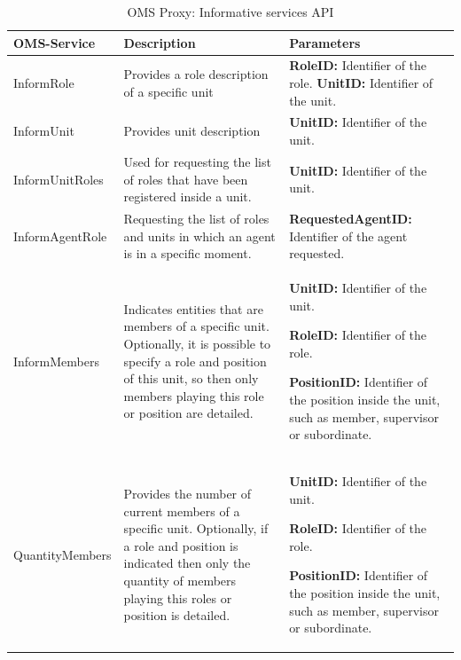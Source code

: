 \begin{table}[h!t]
\begin{tabular}{|l|p{5cm}|p{5cm}|}
\hline
OMS-Service & Description & Parameters \\ \hline

InformRole & Provides a role description of a specific unit
&

\textbf{RoleID:} Identifier of the role.
\textbf{UnitID:} Identifier of the unit. 

\\ \hline

InformUnit & Provides unit description 
&

\textbf{UnitID:} Identifier of the unit. 

\\ \hline

InformUnitRoles & Used for requesting the list of roles that have been registered inside a unit.
&

\textbf{UnitID: }Identifier of the unit.

\\ \hline


InformAgentRole & Requesting the list of roles and units in which an agent is in a specific moment.
& 

\textbf{RequestedAgentID: } Identifier of the agent requested.

\\ \hline
InformMembers & Indicates entities that are members of a specific unit. Optionally, it is possible to specify a role and position of this unit, so then only members playing this role or position are detailed.
 & 

\textbf{UnitID:} Identifier of the unit.

\textbf{RoleID:} Identifier of the role. 

\textbf{PositionID:} Identifier of the position inside the unit, such as member, supervisor or subordinate.

\\ \hline
 QuantityMembers & Provides the number of current members of a specific unit. Optionally, if a role and position is indicated then only the quantity of members playing this roles or position is detailed.
 & 

\textbf{UnitID:} Identifier of the unit.

\textbf{RoleID:} Identifier of the role. 

\textbf{PositionID:} Identifier of the position inside the unit, such as member, supervisor or subordinate.

\\ \hline

\end{tabular}
\caption{OMS Proxy: Informative services API}
\label{tab:thomas_OMSProxy_information}
\end{table}


